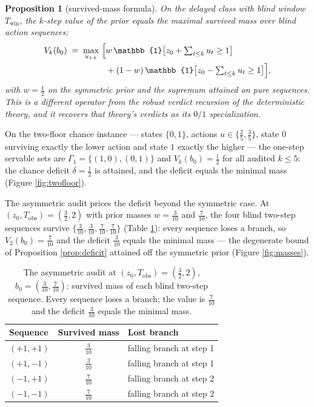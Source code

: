 \documentclass[10pt,twocolumn]{article}
\theoremstyle{plain}
\newtheorem{proposition}[theorem]{Proposition}
\theoremstyle{definition}
\theoremstyle{remark}
\begin{document}
\begin{proposition}[survived-mass formula]\label{prop:degen}
On the delayed class with blind window \(T_{\mathrm{win}}\), the
\(k\)-step value of the prior equals the maximal survived mass over
blind action sequences:
\begin{align*}
V_{k}(b_{0}) \;=\; \max_{u_{1:k}}\ \Bigl[
& w\,\mathbb{1}\bigl[z_{0} + \textstyle\sum_{t \le k} u_{t} \ge 1\bigr]\\
& + (1 - w)\,\mathbb{1}\bigl[z_{0} - \textstyle\sum_{t \le k} u_{t} \ge 1\bigr]
\Bigr],
\end{align*}
with \(w = \tfrac{1}{2}\) on the symmetric prior and the supremum
attained on pure sequences. This is a different operator from the robust
verdict recursion of the deterministic theory, and it recovers that
theory's verdicts as its \(0/1\) specialization.
\end{proposition}

On the two-floor chance instance --- states \(\{0, 1\}\), actions
\(u \in \{\tfrac{2}{5}, \tfrac{3}{5}\}\), state \(0\) surviving exactly
the lower action and state \(1\) exactly the higher --- the one-step
servable sets are \(\Gamma_{1} = \{(1,0), (0,1)\}\) and
\(V_{k}(b_{0}) = \tfrac{1}{2}\) for all audited \(k \le 5\): the chance
deficit \(\delta = \tfrac{1}{2}\) is attained, and the deficit equals the
minimal mass (Figure \ref{fig:twofloor}).

The asymmetric audit prices the deficit beyond the symmetric case. At
\((z_{0}, T_{\mathrm{obs}}) = (\tfrac{3}{2}, 2)\) with prior masses
\(w = \tfrac{3}{10}\) and \(\tfrac{7}{10}\), the four blind two-step
sequences survive
\(\{ \tfrac{3}{10}, \tfrac{3}{10}, \tfrac{7}{10}, \tfrac{7}{10} \}\)
(Table \ref{tab:masses}): every sequence loses a branch, so
\(V_{2}(b_{0}) = \tfrac{7}{10}\) and the deficit
\(\tfrac{3}{10}\) equals the minimal mass --- the degenerate bound of
Proposition \ref{prop:deficit} attained off the symmetric prior (Figure
\ref{fig:masses}).

\begin{table}[t]
\centering
\footnotesize
\caption{The asymmetric audit at
\((z_{0}, T_{\mathrm{obs}}) = (\tfrac{3}{2}, 2)\),
\(b_{0} = (\tfrac{3}{10}, \tfrac{7}{10})\): survived mass of each blind
two-step sequence. Every sequence loses a branch; the value is
\(\tfrac{7}{10}\) and the deficit \(\tfrac{3}{10}\) equals the minimal
mass.}
\label{tab:masses}
\begin{tabular}{@{}l c l@{}}
\toprule
Sequence & Survived mass & Lost branch\\
\midrule
\((+1, +1)\) & $\tfrac{3}{10}$ & falling branch at step 1\\
\((+1, -1)\) & $\tfrac{3}{10}$ & falling branch at step 1\\
\((-1, +1)\) & $\tfrac{7}{10}$ & falling branch at step 2\\
\((-1, -1)\) & $\tfrac{7}{10}$ & falling branch at step 2\\
\bottomrule
\end{tabular}
\end{table}
\end{document}
